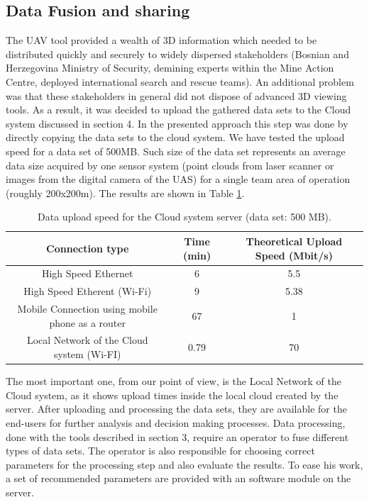 \documentclass{article}
\begin{document}
\subsection{Data Fusion and sharing}
The UAV tool provided a wealth of 3D information which needed to be distributed quickly and securely to widely dispersed stakeholders (Bosnian and Herzegovina Ministry of Security, demining experts within the Mine Action Centre, deployed international search and rescue teams). An additional problem was that these stakeholders in general did not dispose of advanced 3D viewing tools. As a result, it was decided to upload the gathered data sets to the Cloud system discussed in section 4. In the presented approach this step was done by directly copying the data sets to the cloud system. We have tested the upload speed for a data set of 500MB. Such size of the data set represents an average data size acquired by one sensor system (point clouds from laser scanner or images from the digital camera of the UAS) for a single team area of operation (roughly 200x200m). The results are shown in Table \ref{table:upload}.

\begin{table}[h!]
\centering
\begin{tabular}{| c | c | c |}
\hline
Connection type & Time (min) &  Theoretical Upload Speed (Mbit/s)\\ \hline
High Speed Ethernet & 6  & 5.5    \\ \hline
High Speed Etherent (Wi-Fi)	 & 9 & 5.38   \\ \hline
Mobile Connection using mobile phone as a router & 67 & 1 \\ \hline
Local Network of the Cloud system (Wi-FI) & 0.79 & 70 \\ \hline
\end{tabular}
\caption{Data upload speed for the Cloud system server (data set: 500 MB).}
\label{table:upload}
\end{table}
The most important one, from our point of view, is the Local Network of the Cloud system, as it shows upload times inside the local cloud created by the server. After uploading and processing the data sets, they are available for the end-users for further analysis and decision making processes. Data processing, done with the tools described in section 3, require an operator to fuse different types of data sets. The operator is also responsible for choosing correct parameters for the processing step and also evaluate the results. To ease his work, a set of recommended parameters are provided with an software module on the server.
\end{document}
